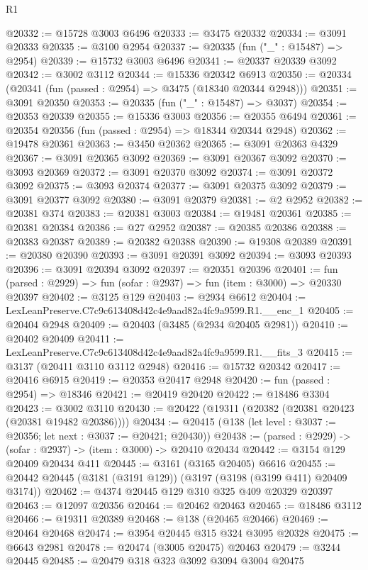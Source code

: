 \begin{lexlean}{R1}
\begin{coremodule}
@20332 := @15728 @3003 @6496
@20333 := @3475 @20332
@20334 := @3091 @20333
@20335 := @3100 @2954
@20337 := @20335 (fun ("_" : @15487) => @2954)
@20339 := @15732 @3003 @6496
@20341 := @20337 @20339 @3092
@20342 := @3002 @3112
@20344 := @15336 @20342 @6913
@20350 := @20334 (@20341 (fun (passed : @2954) => @3475 (@18340 @20344 @2948)))
@20351 := @3091 @20350
@20353 := @20335 (fun ("_" : @15487) => @3037)
@20354 := @20353 @20339
@20355 := @15336 @3003
@20356 := @20355 @6494
@20361 := @20354 @20356 (fun (passed : @2954) => @18344 @20344 @2948)
@20362 := @19478 @20361
@20363 := @3450 @20362
@20365 := @3091 @20363 @4329
@20367 := @3091 @20365 @3092
@20369 := @3091 @20367 @3092
@20370 := @3093 @20369
@20372 := @3091 @20370 @3092
@20374 := @3091 @20372 @3092
@20375 := @3093 @20374
@20377 := @3091 @20375 @3092
@20379 := @3091 @20377 @3092
@20380 := @3091 @20379
@20381 := @2 @2952
@20382 := @20381 @374
@20383 := @20381 @3003
@20384 := @19481 @20361
@20385 := @20381 @20384
@20386 := @27 @2952
@20387 := @20385 @20386
@20388 := @20383 @20387
@20389 := @20382 @20388
@20390 := @19308 @20389
@20391 := @20380 @20390
@20393 := @3091 @20391 @3092
@20394 := @3093 @20393
@20396 := @3091 @20394 @3092
@20397 := @20351 @20396
@20401 := fun (parsed : @2929) => fun (sofar : @2937) => fun (item : @3000) => @20330 @20397
@20402 := @3125 @129
@20403 := @2934 @6612
@20404 := LexLeanPreserve.C7c9c613408d42c4e9aad82a4fc9a9599.R1.__enc_1
@20405 := @20404 @2948
@20409 := @20403 (@3485 (@2934 @20405 @2981))
@20410 := @20402 @20409
@20411 := LexLeanPreserve.C7c9c613408d42c4e9aad82a4fc9a9599.R1.__fits_3
@20415 := @3137 (@20411 @3110 @3112 @2948)
@20416 := @15732 @20342
@20417 := @20416 @6915
@20419 := @20353 @20417 @2948
@20420 := fun (passed : @2954) => @18346
@20421 := @20419 @20420
@20422 := @18486 @3304
@20423 := @3002 @3110
@20430 := @20422 (@19311 (@20382 (@20381 @20423 (@20381 @19482 @20386))))
@20434 := @20415 (@138 (let level : @3037 := @20356; let next : @3037 := @20421; @20430))
@20438 := (parsed : @2929) -> (sofar : @2937) -> (item : @3000) -> @20410 @20434
@20442 := @3154 @129 @20409 @20434 @411
@20445 := @3161 (@3165 @20405) @6616
@20455 := @20442 @20445 (@3181 (@3191 @129)) (@3197 (@3198 (@3199 @411) @20409 @3174))
@20462 := @4374 @20445 @129 @310 @325 @409 @20329 @20397
@20463 := @12097 @20356
@20464 := @20462 @20463
@20465 := @18486 @3112
@20466 := @19311 @20389
@20468 := @138 (@20465 @20466)
@20469 := @20464 @20468
@20474 := @3954 @20445 @315 @324 @3095 @20328
@20475 := @6643 @2981
@20478 := @20474 (@3005 @20475) @20463
@20479 := @3244 @20445
@20485 := @20479 @318 @323 @3092 @3094 @3004 @20475

\end{coremodule}
\end{lexlean}
